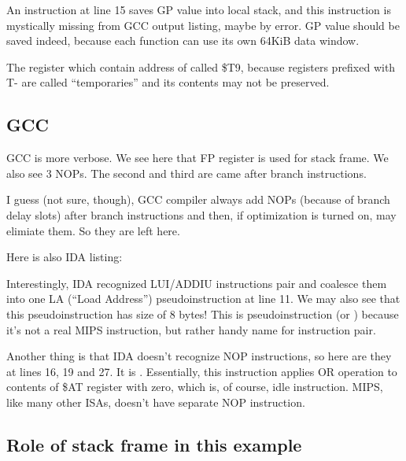 

An instruction at line 15 saves GP value into local stack, and this instruction is mystically missing
from GCC output listing, maybe by error.
GP value should be saved indeed, because each function can use its own 64KiB data window.

The register which contain address of \puts called \$T9, because registers prefixed with T- are called
``temporaries'' and its contents may not be preserved.

\subsection{\NonOptimizing GCC}



\NonOptimizing GCC is more verbose.
We see here that FP register is used for stack frame.
We also see 3 \ac{NOP}s.
The second and third are came after branch instructions.

I guess (not sure, though), GCC compiler always add \ac{NOP}s (because of branch delay slots) after branch
instructions and then, if optimization is turned on, may elimiate them.
So they are left here.

Here is also IDA listing:



Interestingly, IDA recognized LUI/ADDIU instructions pair and coalesce them into one 
LA (``Load Address'') pseudoinstruction at line 11.
We may also see that this pseudoinstruction has size of 8 bytes!
This is pseudoinstruction (or ) because it's not a real MIPS instruction, but rather
handy name for instruction pair.

Another thing is that IDA doesn't recognize \ac{NOP} instructions, so here are they at lines 16, 19 and 27.
It is . Essentially, this instruction applies OR operation to contents of \$AT register
with zero, which is, of course, idle instruction. 
MIPS, like many other \ac{ISA}s, doesn't have separate \ac{NOP} instruction.

\subsection{Role of stack frame in this example}

